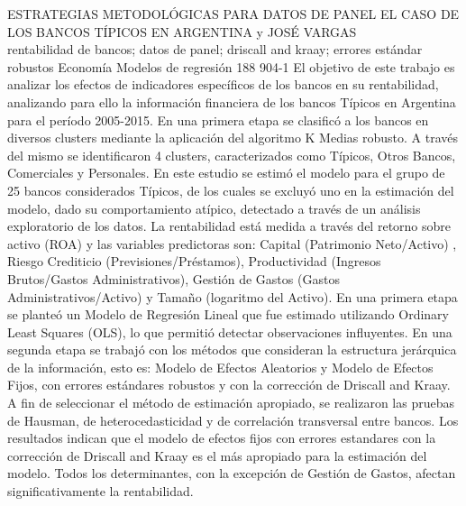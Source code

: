 \A
{ESTRATEGIAS METODOLÓGICAS PARA DATOS DE PANEL EL CASO DE LOS BANCOS TÍPICOS EN ARGENTINA}
{ y JOSÉ VARGAS}
{
\\}
{rentabilidad de bancos; datos de panel; driscall and kraay; errores estándar robustos} 
 {Economía} 
 {Modelos de regresión} 
 {188} 
 {904-1}
{El objetivo de este trabajo es analizar los efectos de indicadores específicos de los bancos en su rentabilidad, analizando para ello la información financiera de los bancos Típicos en Argentina para el período 2005-2015. En una primera etapa se clasificó a los bancos en diversos clusters mediante la aplicación del algoritmo K Medias robusto. A través del mismo se identificaron 4 clusters, caracterizados como Típicos, Otros Bancos, Comerciales y Personales. En este estudio se estimó el modelo para el grupo de 25 bancos considerados Típicos, de los cuales se excluyó uno en la estimación del modelo, dado su comportamiento atípico, detectado a través de un análisis exploratorio de los datos. La rentabilidad está medida a través del retorno sobre activo (ROA) y las variables predictoras son: Capital (Patrimonio Neto/Activo) , Riesgo Crediticio (Previsiones/Préstamos), Productividad (Ingresos Brutos/Gastos Administrativos), Gestión de Gastos (Gastos Administrativos/Activo) y Tamaño (logaritmo del Activo). En una primera etapa se planteó un Modelo de Regresión Lineal que fue estimado utilizando Ordinary Least Squares (OLS), lo que permitió detectar observaciones influyentes. En una segunda etapa se trabajó con los métodos que consideran la estructura jerárquica de la información, esto es: Modelo de Efectos Aleatorios y Modelo de Efectos Fijos, con errores estándares robustos y con la corrección de Driscall and Kraay. A fin de seleccionar el método de estimación apropiado, se realizaron las pruebas de Hausman, de heterocedasticidad y de correlación transversal entre bancos. Los resultados indican que el modelo de efectos fijos con errores estandares con la corrección de Driscall and Kraay es el más apropiado para la estimación del modelo. Todos los determinantes, con la excepción de Gestión de Gastos, afectan significativamente la rentabilidad.}
